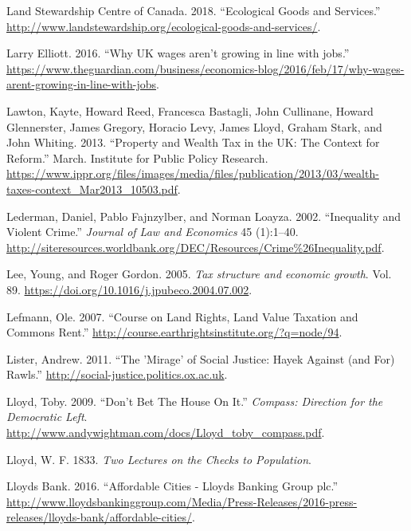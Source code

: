 \documentclass[]{tufte-handout}
\begin{document}
\leavevmode\hypertarget{ref-LandStewardshipCentreofCanada2018}{}%
Land Stewardship Centre of Canada. 2018. ``Ecological Goods and
Services.''
\url{http://www.landstewardship.org/ecological-goods-and-services/}.

\leavevmode\hypertarget{ref-LarryElliott2016}{}%
Larry Elliott. 2016. ``Why UK wages aren't growing in line with jobs.''
\url{https://www.theguardian.com/business/economics-blog/2016/feb/17/why-wages-arent-growing-in-line-with-jobs}.

\leavevmode\hypertarget{ref-Lawton2013a}{}%
Lawton, Kayte, Howard Reed, Francesca Bastagli, John Cullinane, Howard
Glennerster, James Gregory, Horacio Levy, James Lloyd, Graham Stark, and
John Whiting. 2013. ``Property and Wealth Tax in the UK: The Context for
Reform.'' March. Institute for Public Policy Research.
\url{https://www.ippr.org/files/images/media/files/publication/2013/03/wealth-taxes-context_Mar2013_10503.pdf}.

\leavevmode\hypertarget{ref-Lederman2002}{}%
Lederman, Daniel, Pablo Fajnzylber, and Norman Loayza. 2002.
``Inequality and Violent Crime.'' \emph{Journal of Law and Economics} 45
(1):1--40.
\url{http://siteresources.worldbank.org/DEC/Resources/Crime\%26Inequality.pdf}.

\leavevmode\hypertarget{ref-Lee2005}{}%
Lee, Young, and Roger Gordon. 2005. \emph{Tax structure and economic
growth}. Vol. 89. \url{https://doi.org/10.1016/j.jpubeco.2004.07.002}.

\leavevmode\hypertarget{ref-Lefmann2007}{}%
Lefmann, Ole. 2007. ``Course on Land Rights, Land Value Taxation and
Commons Rent.'' \url{http://course.earthrightsinstitute.org/?q=node/94}.

\leavevmode\hypertarget{ref-Lister2011}{}%
Lister, Andrew. 2011. ``The 'Mirage' of Social Justice: Hayek Against
(and For) Rawls.'' \url{http://social-justice.politics.ox.ac.uk}.

\leavevmode\hypertarget{ref-Lloyd2009}{}%
Lloyd, Toby. 2009. ``Don't Bet The House On It.'' \emph{Compass:
Direction for the Democratic Left}.
\url{http://www.andywightman.com/docs/Lloyd_toby_compass.pdf}.

\leavevmode\hypertarget{ref-Lloyd1833}{}%
Lloyd, W. F. 1833. \emph{Two Lectures on the Checks to Population}.

\leavevmode\hypertarget{ref-LloydsBank2016}{}%
Lloyds Bank. 2016. ``Affordable Cities - Lloyds Banking Group plc.''
\url{http://www.lloydsbankinggroup.com/Media/Press-Releases/2016-press-releases/lloyds-bank/affordable-cities/}.
\end{document}
